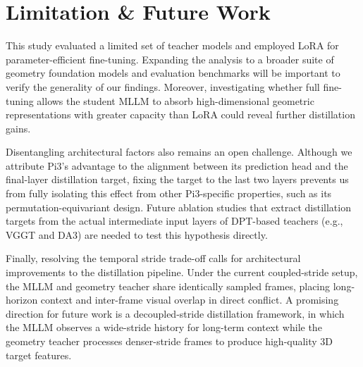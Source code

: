 \section{Limitation \& Future Work}
\label{sec:limitations}

This study evaluated a limited set of teacher models and employed LoRA for parameter-efficient fine-tuning. Expanding the analysis to a broader suite of geometry foundation models and evaluation benchmarks will be important to verify the generality of our findings. Moreover, investigating whether full fine-tuning allows the student MLLM to absorb high-dimensional geometric representations with greater capacity than LoRA could reveal further distillation gains.

Disentangling architectural factors also remains an open challenge. Although we attribute Pi3's advantage to the alignment between its prediction head and the final-layer distillation target, fixing the target to the last two layers prevents us from fully isolating this effect from other Pi3-specific properties, such as its permutation-equivariant design. Future ablation studies that extract distillation targets from the actual intermediate input layers of DPT-based teachers (e.g., VGGT and DA3) are needed to test this hypothesis directly.

Finally, resolving the temporal stride trade-off calls for architectural improvements to the distillation pipeline. Under the current coupled-stride setup, the MLLM and geometry teacher share identically sampled frames, placing long-horizon context and inter-frame visual overlap in direct conflict. A promising direction for future work is a decoupled-stride distillation framework, in which the MLLM observes a wide-stride history for long-term context while the geometry teacher processes denser-stride frames to produce high-quality 3D target features.
